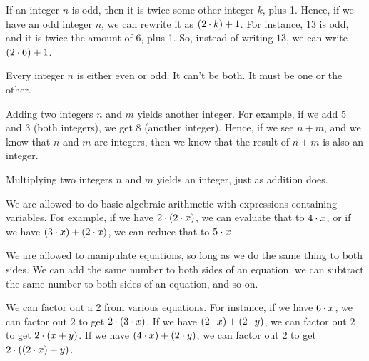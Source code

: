\documentclass[../../../main.tex]{subfiles}
\begin{document}
\begin{fact}
  \label{fact:odd-ints-definition}
  If an integer $n$ is odd, then it is twice some other integer $k$, plus 1. Hence, if we have an odd integer $n$, we can rewrite it as $(2 \mult/ k) + 1$. For instance, $13$ is odd, and it is twice the amount of $6$, plus 1. So, instead of writing $13$, we can write $(2 \mult/ 6) + 1$.
\end{fact}

\begin{fact}
  \label{fact:every-int-is-even-or-odd}
  Every integer $n$ is either even or odd. It can't be both. It must be one or the other.
\end{fact}
  
\begin{fact}
  \label{fact:adding-ints-yields-an-int}
  Adding two integers $n$ and $m$ yields another integer. For example, if we add $5$ and $3$ (both integers), we get $8$ (another integer). Hence, if we see $n + m$, and we know that $n$ and $m$ are integers, then we know that the result of $n + m$ is also an integer.
\end{fact}
  
\begin{fact}
  \label{fact:multiplying-ints-yields-an-int}
  Multiplying two integers $n$ and $m$ yields an integer, just as addition does.
\end{fact}

\begin{fact}
  \label{fact:basic-algebra}
  We are allowed to do basic algebraic arithmetic with expressions containing variables. For example, if we have $2 \mult/ (2 \mult/ x)$, we can evaluate that to $4 \mult/ x$, or if we have $(3 \mult/ x) + (2 \mult/ x)$, we can reduce that to $5 \mult/ x$.
\end{fact}

\begin{fact}
  \label{fact:balanced-manipulations}
  We are allowed to manipulate equations, so long as we do the same thing to both sides. We can add the same number to both sides of an equation, we can subtract the same number to both sides of an equation, and so on.
\end{fact}

\begin{fact}
  \label{fact:factor-out-two}
  We can factor out a 2 from various equations. For instance, if we have $6 \mult/ x$, we can factor out $2$ to get $2 \mult/ (3 \mult/ x)$. If we have $(2 \mult/ x) + (2 \mult/ y)$, we can factor out $2$ to get $2 \mult/ (x + y)$. If we have $(4 \mult/ x) + (2 \mult/ y)$, we can factor out $2$ to get $2 \mult/ ((2 \mult/ x) + y)$.
\end{fact}
  
\end{document}

